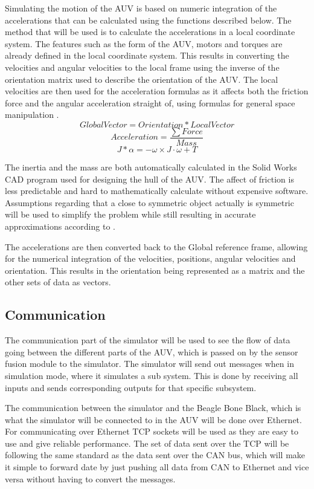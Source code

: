 Simulating the motion of the AUV is based on numeric integration of the accelerations that can be calculated using the functions described below. The method that will be used is to calculate the accelerations in a local coordinate system. The features such as the form of the AUV, motors and torques are already defined in the local coordinate system. This results in converting the velocities and angular velocities to the local frame using the inverse of the orientation matrix used to describe the orientation of the AUV. The local velocities are then used for the acceleration formulas as it affects both the friction force and the angular acceleration straight of, using formulas for general space manipulation \cite{book:corke2013}.
\begin{equation}
Global Vector = Orientation*Local Vector
\end{equation}
\begin{equation}
Acceleration = \frac{\sum Force}{Mass}
\end{equation}
\begin{equation}
J*\alpha = - \omega \times J \cdot\omega + T 
\end{equation}


The inertia and the mass are both automatically calculated in the Solid Works CAD program used for designing the hull of the AUV. The affect of friction is less predictable and hard to mathematically calculate without expensive software. Assumptions regarding that a close to symmetric object actually is symmetric will be used to simplify the problem while still resulting in accurate approximations according to \cite{4772083}.

The accelerations are then converted back to the Global reference frame, allowing for the numerical integration of the velocities, positions, angular velocities and orientation. This results in the orientation being represented as a matrix and the other sets of data as vectors.
\subsection{Communication}

The communication part of the simulator will be used to see the flow of data going between the different parts of the AUV, which is passed on by the sensor fusion module to the simulator. The simulator will send out messages when in simulation mode, where it simulates a sub system. This is done by receiving all inputs and sends corresponding outputs for that specific subsystem.

The communication between the simulator and the Beagle Bone Black, which is what the simulator will be connected to in the AUV will be done over Ethernet. For communicating over Ethernet TCP sockets will be used as they are easy to use and give reliable performance. The set of data sent over the TCP will be following the same standard as the data sent over the CAN bus, which will make it simple to forward date by just pushing all data from CAN to Ethernet and vice versa without having to convert the messages.

